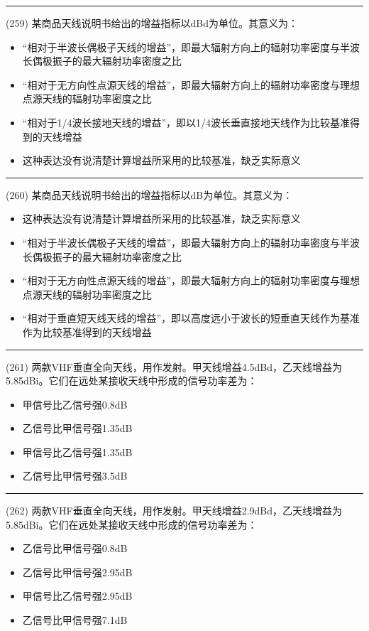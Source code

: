 \documentclass[twocolumn]{ctexart}  %
\begin{document}
\noindent\rule{0.5\textwidth}{1pt}
\heiti (259) 某商品天线说明书给出的增益指标以dBd为单位。其意义为： \songti {\color{gray} [LK0930] }
\begin{itemize}
	\item  “相对于半波长偶极子天线的增益”，即最大辐射方向上的辐射功率密度与半波长偶极振子的最大辐射功率密度之比
	\item  “相对于无方向性点源天线的增益”，即最大辐射方向上的辐射功率密度与理想点源天线的辐射功率密度之比
	\item  “相对于1/4波长接地天线的增益”，即以1/4波长垂直接地天线作为比较基准得到的天线增益
	\item  这种表达没有说清楚计算增益所采用的比较基准，缺乏实际意义
\end{itemize}


\noindent\rule{0.5\textwidth}{1pt}
\heiti (260) 某商品天线说明书给出的增益指标以dB为单位。其意义为： \songti {\color{gray} [LK0931] }
\begin{itemize}
	\item  这种表达没有说清楚计算增益所采用的比较基准，缺乏实际意义
	\item  “相对于半波长偶极子天线的增益”，即最大辐射方向上的辐射功率密度与半波长偶极振子的最大辐射功率密度之比
	\item  “相对于无方向性点源天线的增益”，即最大辐射方向上的辐射功率密度与理想点源天线的辐射功率密度之比
	\item  “相对于垂直短天线天线的增益”，即以高度远小于波长的短垂直天线作为基准作为比较基准得到的天线增益
\end{itemize}


\noindent\rule{0.5\textwidth}{1pt}
\heiti (261) 两款VHF垂直全向天线，用作发射。甲天线增益4.5dBd，乙天线增益为5.85dBi。它们在远处某接收天线中形成的信号功率差为： \songti {\color{gray} [LK0932] }
\begin{itemize}
	\item  甲信号比乙信号强0.8dB
	\item  乙信号比甲信号强1.35dB
	\item  甲信号比乙信号强1.35dB
	\item  乙信号比甲信号强3.5dB
\end{itemize}


\noindent\rule{0.5\textwidth}{1pt}
\heiti (262) 两款VHF垂直全向天线，用作发射。甲天线增益2.9dBd，乙天线增益为5.85dBi。它们在远处某接收天线中形成的信号功率差为： \songti {\color{gray} [LK0933] }
\begin{itemize}
	\item  乙信号比甲信号强0.8dB
	\item  乙信号比甲信号强2.95dB
	\item  甲信号比乙信号强2.95dB
	\item  乙信号比甲信号强7.1dB
\end{itemize}
\end{document}
